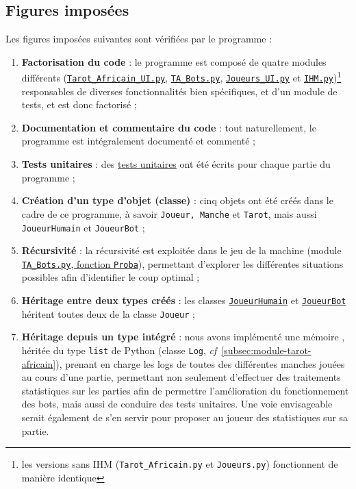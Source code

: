    \subsection{Figures imposées}\label{subsec:figures-imposées}
      Les figures imposées suivantes sont vérifiées par le programme :
      \begin{enumerate}
         \item \textbf{Factorisation du code} : le programme est composé de quatre modules différents (\hyperref[subsec:module-tarot-africain]{\texttt{Tarot\_Africain\_UI.py}}, \hyperref[subsec:module-ta-bots]{\texttt{TA\_Bots.py}}, \hyperref[subsec:module-joueurs]{\texttt{Joueurs\_UI.py}} et \hyperref[subsec:module-ihm]{\texttt{IHM.py}})\footnote{les versions sans IHM (\texttt{Tarot\_Africain.py} et \texttt{Joueurs.py}) fonctionnent de manière identique} responsables de diverses fonctionnalités bien spécifiques, et d'un module de tests, et est donc factorisé ;
         \item \textbf{Documentation et commentaire du code} : tout naturellement, le programme est intégralement documenté et commenté ;
         \item \textbf{Tests unitaires} : des \hyperref[subsec:tests-effectués]{tests unitaires} ont été écrits pour chaque partie du programme ;
         \item \textbf{Création d'un type d'objet (classe)} : cinq objets ont été créés dans le cadre de ce programme, à savoir \texttt{Joueur, Manche} et \texttt{Tarot}, mais aussi \texttt{JoueurHumain} et \texttt{JoueurBot} ;
         \item \textbf{Récursivité} : la récursivité est exploitée dans le jeu de la machine (module \hyperref[subsec:module-ta-bots]{\texttt{TA\_Bots.py}, fonction \texttt{Proba}}), permettant d'explorer les différentes situations possibles afin d'identifier le coup optimal ;
         \item \textbf{Héritage entre deux types créés} : les classes \hyperref[subsec:module-joueurs]{\texttt{JoueurHumain}} et \hyperref[subsec:module-joueurs]{\texttt{JoueurBot}} héritent toutes deux de la classe \texttt{Joueur} ;
         \item \textbf{Héritage depuis un type intégré} : nous avons implémenté une \og mémoire \fg{}, héritée du type \texttt{list} de Python (classe \texttt{Log}, \textit{cf}~\ref{subsec:module-tarot-africain}), prenant en charge les logs de toutes des différentes manches jouées au cours d'une partie, permettant non seulement d'effectuer des traitements statistiques sur les parties afin de permettre l'amélioration du fonctionnement des bots, mais aussi de conduire des tests unitaires.
         Une voie envisageable serait également de s'en servir pour proposer au joueur des statistiques sur sa partie.
      \end{enumerate}

